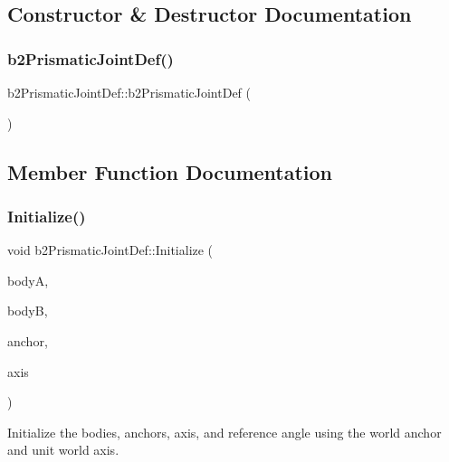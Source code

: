 \subsection{Constructor \& Destructor Documentation}
\mbox{\label{structb2_prismatic_joint_def_aed2cd56b9d870058413f9bd33ee915b9}} 
\subsubsection{\texorpdfstring{b2PrismaticJointDef()}{b2PrismaticJointDef()}}
{\footnotesize\ttfamily b2\+Prismatic\+Joint\+Def\+::b2\+Prismatic\+Joint\+Def (\begin{DoxyParamCaption}{ }\end{DoxyParamCaption})\hspace{0.3cm}{\ttfamily [inline]}}



\subsection{Member Function Documentation}
\mbox{\label{structb2_prismatic_joint_def_ae60043bc22b077e8c59ab248dc34652f}} 
\subsubsection{\texorpdfstring{Initialize()}{Initialize()}}
{\footnotesize\ttfamily void b2\+Prismatic\+Joint\+Def\+::\+Initialize (\begin{DoxyParamCaption}\item[{\mbox{\hyperlink{classb2_body}{b2\+Body}} $\ast$}]{bodyA,  }\item[{\mbox{\hyperlink{classb2_body}{b2\+Body}} $\ast$}]{bodyB,  }\item[{const \mbox{\hyperlink{structb2_vec2}{b2\+Vec2}} \&}]{anchor,  }\item[{const \mbox{\hyperlink{structb2_vec2}{b2\+Vec2}} \&}]{axis }\end{DoxyParamCaption})}

Initialize the bodies, anchors, axis, and reference angle using the world anchor and unit world axis. 

